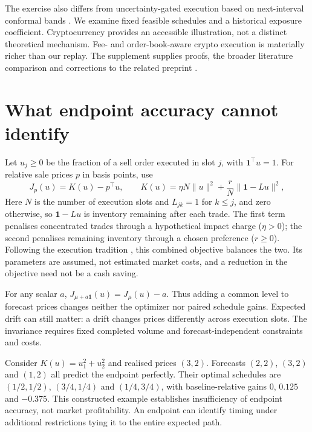 \documentclass[11pt]{article}
\begin{document}
The exercise also differs from uncertainty-gated execution based on next-interval conformal bands \citep{irshad2026}. We examine fixed feasible schedules and a historical exposure coefficient. Cryptocurrency provides an accessible illustration, not a distinct theoretical mechanism. Fee- and order-book-aware crypto execution \citep{bundi2024} is materially richer than our replay. The supplement supplies proofs, the broader literature comparison and corrections to the related preprint \citep{lai2026}.

\section{What endpoint accuracy cannot identify}
Let $u_j\geq0$ be the fraction of a sell order executed in slot $j$, with $\mathbf1^\top u=1$. For relative sale prices $p$ in basis points, use
\begin{equation}
J_p(u)=K(u)-p^\top u,\qquad
K(u)=\eta N\|u\|^2+\frac rN\|\mathbf1-Lu\|^2,
\label{eq:cost}
\end{equation}
Here $N$ is the number of execution slots and $L_{jk}=1$ for $k\leq j$, and zero otherwise, so $\mathbf1-Lu$ is inventory remaining after each trade. The first term penalises concentrated trades through a hypothetical impact charge ($\eta>0$); the second penalises remaining inventory through a chosen preference ($r\geq0$). Following the execution tradition \citep{almgren2001}, this combined objective balances the two. Its parameters are assumed, not estimated market costs, and a reduction in the objective need not be a cash saving.

For any scalar $a$, $J_{\mu+a\mathbf1}(u)=J_\mu(u)-a$. Thus adding a common level to forecast prices changes neither the optimizer nor paired schedule gains. Expected drift can still matter: a drift changes prices differently across execution slots. The invariance requires fixed completed volume and forecast-independent constraints and costs.

Consider $K(u)=u_1^2+u_2^2$ and realised prices $(3,2)$. Forecasts $(2,2)$, $(3,2)$ and $(1,2)$ all predict the endpoint perfectly. Their optimal schedules are $(1/2,1/2)$, $(3/4,1/4)$ and $(1/4,3/4)$, with baseline-relative gains $0$, $0.125$ and $-0.375$. This constructed example establishes insufficiency of endpoint accuracy, not market profitability. An endpoint can identify timing under additional restrictions tying it to the entire expected path.
\end{document}
